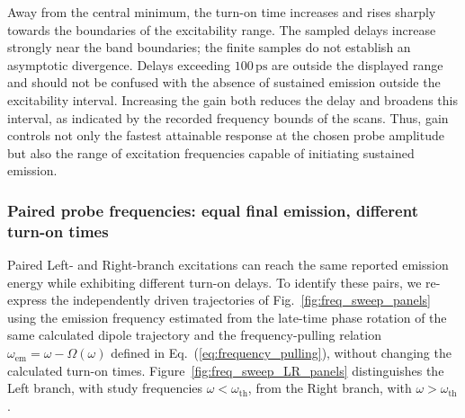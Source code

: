 \documentclass{optica-article}
\begin{document}

Away from the central minimum, the turn-on time increases and rises sharply towards the boundaries of the excitability range. The sampled delays increase strongly near the band boundaries; the finite samples do not establish an asymptotic divergence. Delays exceeding $100\,\mathrm{ps}$ are outside the displayed range and should not be confused with the absence of sustained emission outside the excitability interval. Increasing the gain both reduces the delay and broadens this interval, as indicated by the recorded frequency bounds of the scans. Thus, gain controls not only the fastest attainable response at the chosen probe amplitude but also the range of excitation frequencies capable of initiating sustained emission.


\subsubsection{Paired probe frequencies: equal final emission, different turn-on times}
\label{sec:paired_turn_on}

Paired Left- and Right-branch excitations can reach the same reported emission energy while exhibiting different turn-on delays. To identify these pairs, we re-express the independently driven trajectories of Fig.~\ref{fig:freq_sweep_panels} using the emission frequency estimated from the late-time phase rotation of the same calculated dipole trajectory and the frequency-pulling relation $\omega_{\mathrm{em}}=\omega-\Omega(\omega)$ defined in Eq.~(\ref{eq:frequency_pulling}), without changing the calculated turn-on times. Figure~\ref{fig:freq_sweep_LR_panels} distinguishes the Left branch, with study frequencies $\omega<\omega_{\mathrm{th}}$, from the Right branch, with $\omega>\omega_{\mathrm{th}}$.
\end{document}
